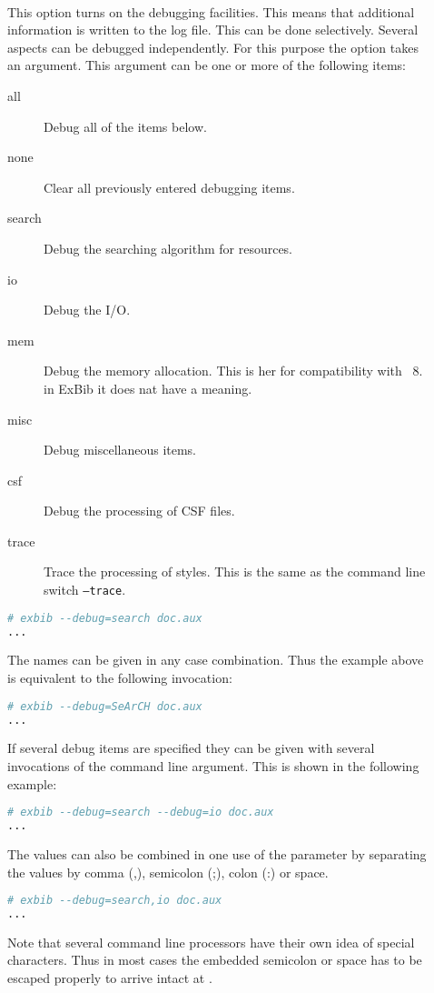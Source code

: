 \begin{description}
\item[ ]
\item[ ]\ \\
  This option turns on the debugging facilities. This means that
  additional information is written to the log file.  This can be done
  selectively. Several aspects can be debugged independently. For this
  purpose the option takes an argument. This argument can be one or
  more of the following items:
  \begin{description}
  \item[all] 
    Debug all of the items below.
  \item[none] 
    Clear all previously entered debugging items.
  \item[search]
    Debug the searching algorithm for resources.
  \item[io] 
    Debug the I/O.
  \item[mem] Debug the memory allocation. This is her for
    compatibility with \BibTeX~8. in ExBib it does nat have a meaning.
  \item[misc] 
    Debug miscellaneous items.
  \item[csf] 
    Debug the processing of CSF files.
  \item[trace] 
    Trace the processing of styles. This is the same as the command
    line switch \texttt{--trace}.
  \end{description}
\begin{lstlisting}[language=sh]
# exbib --debug=search doc.aux
...
\end{lstlisting}
The names can be given in any case combination. Thus the example above
is equivalent to the following invocation:
\begin{lstlisting}[language=sh]
# exbib --debug=SeArCH doc.aux
...
\end{lstlisting}
If several debug items are specified they can be given with several
invocations of the command line argument. This is shown in the
following example:
\begin{lstlisting}[language=sh]
# exbib --debug=search --debug=io doc.aux
...
\end{lstlisting}
The values can also be combined in one use of the parameter by
separating the values by comma (,), semicolon (;), colon (:) or space.
\begin{lstlisting}[language=sh]
# exbib --debug=search,io doc.aux
...
\end{lstlisting}

Note that several command line processors have their own idea of
special characters. Thus in most cases the embedded semicolon or space
has to be escaped properly to arrive intact at \ExBib.

\end{description}

